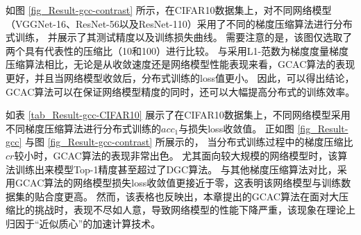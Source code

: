 \documentclass{xdupgthesis}
\begin{document}
如图 \ref{fig_Result-gcc-contrast} 所示，在CIFAR10数据集上，对不同网络模型（VGGNet-16、ResNet-56以及ResNet-110）采用了不同的梯度压缩算法进行分布式训练，
并展示了其测试精度以及训练损失曲线。
需要注意的是，该图仅选取了两个具有代表性的压缩比（10和100）进行比较。
与采用L1-范数为梯度度量梯度压缩算法相比，无论是从收敛速度还是网络模型性能表现来看，GCAC算法的表现更好，并且当网络模型收敛后，分布式训练的loss值更小。
因此，可以得出结论，GCAC算法可以在保证网络模型精度的同时，还可以大幅提高分布式的训练效率。
 

如表 \ref*{tab_Result-gcc-CIFAR10} 展示了在CIFAR10数据集上，不同网络模型采用不同梯度压缩算法进行分布式训练的$acc_{1}$与损失loss收敛值。
正如图 \ref*{fig_Result-gcc} 与图 \ref*{fig_Result-gcc-contrast} 所展示的，
当分布式训练过程中的梯度压缩比$cr$较小时，GCAC算法的表现非常出色。
尤其面向较大规模的网络模型时，该算法训练出来模型Top-1精度甚至超过了DGC算法。
与其他梯度压缩算法对比，采用GCAC算法的网络模型损失loss收敛值更接近于零，这表明该网络模型与训练数据集的贴合度更高。
然而，该表格也反映出，本章提出的GCAC算法在面对大压缩比的挑战时，表现不尽如人意，导致网络模型的性能下降严重，该现象在理论上归因于“近似质心”的加速计算技术。
\end{document}
